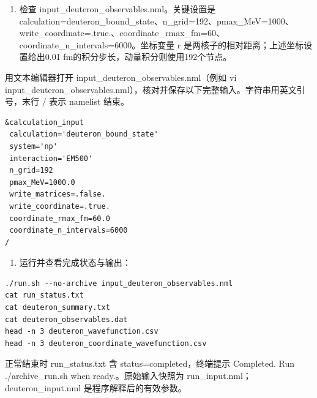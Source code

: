 \documentclass[UTF8,a4paper,zihao=5,fontset=fandol]{ctexart}
\begin{document}
\begin{enumerate}[start=1]
\item 检查 {\ttfamily\small input\_\allowbreak{}deuteron\_\allowbreak{}observables.\allowbreak{}nml}。关键设置是 {\ttfamily\small calculation=\allowbreak{}deuteron\_\allowbreak{}bound\_\allowbreak{}state}、{\ttfamily\small n\_\allowbreak{}grid=\allowbreak{}192}、{\ttfamily\small pmax\_\allowbreak{}MeV=\allowbreak{}1000}、{\ttfamily\small write\_\allowbreak{}coordinate=\allowbreak{}.\allowbreak{}true.\allowbreak{}}、{\ttfamily\small coordinate\_\allowbreak{}rmax\_\allowbreak{}fm=\allowbreak{}60}、{\ttfamily\small coordinate\_\allowbreak{}n\_\allowbreak{}intervals=\allowbreak{}6000}。坐标变量 {\ttfamily\small r} 是两核子的相对距离；上述坐标设置给出0.01 fm的积分步长，动量积分则使用192个节点。


\end{enumerate}
用文本编辑器打开 {\ttfamily\small input\_\allowbreak{}deuteron\_\allowbreak{}observables.\allowbreak{}nml}（例如 {\ttfamily\small vi input\_\allowbreak{}deuteron\_\allowbreak{}observables.\allowbreak{}nml}），核对并保存以下完整输入。字符串用英文引号，末行 {\ttfamily\small /\allowbreak{}} 表示 namelist 结束。


\begin{Verbatim}[samepage=true,breaklines=true,breakanywhere=true,fontsize=\small,frame=leftline,framesep=3mm,rulecolor=\color{bluegray}]
&calculation_input
 calculation='deuteron_bound_state'
 system='np'
 interaction='EM500'
 n_grid=192
 pmax_MeV=1000.0
 write_matrices=.false.
 write_coordinate=.true.
 coordinate_rmax_fm=60.0
 coordinate_n_intervals=6000
/
\end{Verbatim}
\begin{enumerate}[start=2]
\item 运行并查看完成状态与输出：


\end{enumerate}

\begin{Verbatim}[samepage=true,breaklines=true,breakanywhere=true,fontsize=\small,frame=leftline,framesep=3mm,rulecolor=\color{bluegray}]
./run.sh --no-archive input_deuteron_observables.nml
cat run_status.txt
cat deuteron_summary.txt
cat deuteron_observables.dat
head -n 3 deuteron_wavefunction.csv
head -n 3 deuteron_coordinate_wavefunction.csv
\end{Verbatim}
正常结束时 {\ttfamily\small run\_\allowbreak{}status.\allowbreak{}txt} 含 {\ttfamily\small status=\allowbreak{}completed}，终端提示 {\ttfamily\small Completed.\allowbreak{} Run .\allowbreak{}/\allowbreak{}archive\_\allowbreak{}run.\allowbreak{}sh when ready.\allowbreak{}}。原始输入快照为 {\ttfamily\small run\_\allowbreak{}input.\allowbreak{}nml}；{\ttfamily\small deuteron\_\allowbreak{}input.\allowbreak{}nml} 是程序解释后的有效参数。
\end{document}
